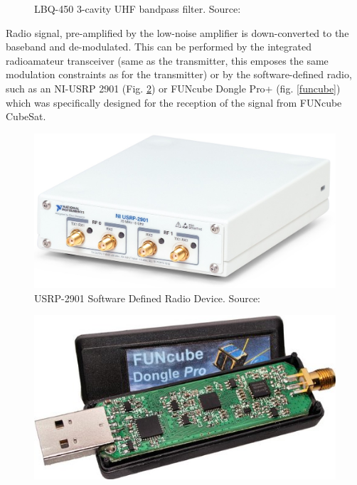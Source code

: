 \begin{minipage}{\linewidth}
\begin{minipage}{0.45\linewidth}
\begin{figure}[H]
            \caption{LBQ-450 3-cavity UHF bandpass filter. Source: \cite{cavity_uhf}}
            \label{cavity_uhf}
        \end{figure}
    \end{minipage}
\end{minipage}


Radio signal, pre-amplified by the low-noise amplifier is down-converted to the baseband and de-modulated. This can be performed by the integrated radioamateur transceiver (same as the transmitter, this emposes the same modulation constraints as for the transmitter) or by the software-defined radio, such as an NI-USRP 2901 (Fig. \ref{ni_2901}) or FUNcube Dongle Pro+ (fig. \ref{funcube}) which was specifically designed for the reception of the signal from FUNcube CubeSat.

\begin{minipage}{\linewidth}
    \centering
    \begin{minipage}{0.45\linewidth}
        \begin{figure}[H]
            \centering
            \includegraphics[width=0.3\paperwidth]{img/4/ni_2901.png}
            \caption{USRP-2901 Software Defined Radio Device. Source: \cite{ni_2901}}
            \label{ni_2901}
        \end{figure}
    \end{minipage}
    \hspace{0.05\linewidth}
    \begin{minipage}{0.45\linewidth}
        \begin{figure}[H]
            \centering
            \includegraphics[width=0.3\paperwidth]{img/4/funcube.jpg}

\end{figure}
\end{minipage}
\end{minipage}
